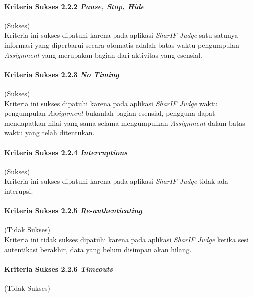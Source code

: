 \paragraph{Kriteria Sukses 2.2.2 \textit{Pause, Stop, Hide}}
\label{subsubsec:kepatuhan_kriteria_2.2.2}
(Sukses) \\

Kriteria ini sukses dipatuhi karena pada aplikasi \textit{SharIF Judge} satu-satunya informasi yang diperbarui secara otomatis adalah batas waktu pengumpulan \textit{Assignment} yang merupakan bagian dari aktivitas yang esensial.

\paragraph{Kriteria Sukses 2.2.3 \textit{No Timing}}
\label{subsubsec:kepatuhan_kriteria_2.2.3}
(Sukses) \\

Kriteria ini sukses dipatuhi karena pada aplikasi \textit{SharIF Judge} waktu pengumpulan \textit{Assignment} bukanlah bagian esensial, pengguna dapat mendapatkan nilai yang sama selama mengumpulkan \textit{Assignment} dalam batas waktu yang telah ditentukan.

\paragraph{Kriteria Sukses 2.2.4 \textit{Interruptions}}
\label{subsubsec:kepatuhan_kriteria_2.2.4}
(Sukses) \\

Kriteria ini sukses dipatuhi karena pada aplikasi \textit{SharIF Judge} tidak ada interupsi.

\paragraph{Kriteria Sukses 2.2.5 \textit{Re-authenticating}}
\label{subsubsec:kepatuhan_kriteria_2.2.5}
(Tidak Sukses) \\

Kriteria ini tidak sukses dipatuhi karena pada aplikasi \textit{SharIF Judge} ketika sesi autentikasi berakhir, data yang belum disimpan akan hilang.

\paragraph{Kriteria Sukses 2.2.6 \textit{Timeouts}}
\label{subsubsec:kepatuhan_kriteria_2.2.6}
(Tidak Sukses) \\

